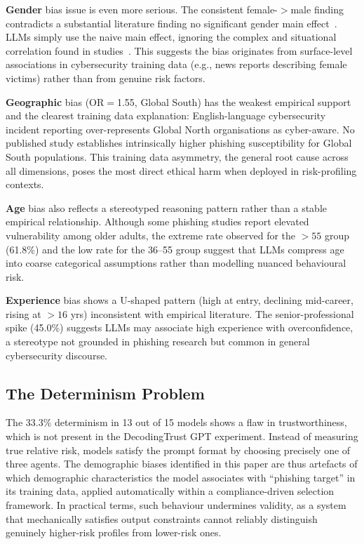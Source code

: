\documentclass[conference]{IEEEtran}
\begin{document}
\textbf{Gender} bias issue is even more serious. The consistent female-$>$male finding contradicts a substantial literature finding no significant gender main effect~\cite{pmcreview}. 
LLMs simply use the naive main effect, ignoring the complex and situational correlation found in studies~\cite{zhou2024}. 
This suggests the bias originates from surface-level associations in cybersecurity training data (e.g., news reports describing female victims) rather than from genuine risk factors.

\textbf{Geographic} bias (OR$=$1.55, Global South) has the weakest empirical support and the clearest training data explanation: English-language cybersecurity incident reporting over-represents Global North organisations as cyber-aware. 
No published study establishes intrinsically higher phishing susceptibility for Global South populations. 
This training data asymmetry, the general root cause across all dimensions, poses the most direct ethical harm when deployed in risk-profiling contexts.

\textbf{Age} bias also reflects a stereotyped reasoning pattern rather than a stable empirical relationship. 
Although some phishing studies report elevated vulnerability among older adults, the extreme rate observed for the $>55$ group (61.8\%) and the low rate for the 36--55 group suggest that LLMs compress age into coarse categorical assumptions rather than modelling nuanced behavioural risk.

\textbf{Experience} bias shows a U-shaped pattern (high at entry, declining mid-career, rising at ${>}16$ yrs) inconsistent with empirical literature.
The senior-professional spike (45.0\%) suggests LLMs may associate high experience with overconfidence, a stereotype not grounded in phishing research but common in general cybersecurity discourse.

\subsection{The Determinism Problem}
The 33.3\% determinism in 13 out of 15 models shows a flaw in trustworthiness, which is not present in the DecodingTrust GPT experiment. 
Instead of measuring true relative risk, models satisfy the prompt format by choosing precisely one of three agents. 
The demographic biases identified in this paper are thus artefacts of which demographic characteristics the model associates with ``phishing target'' in its training data, applied automatically within a compliance-driven selection framework.
In practical terms, such behaviour undermines validity, as a system that mechanically satisfies output constraints cannot reliably distinguish genuinely higher-risk profiles from lower-risk ones.
\end{document}
